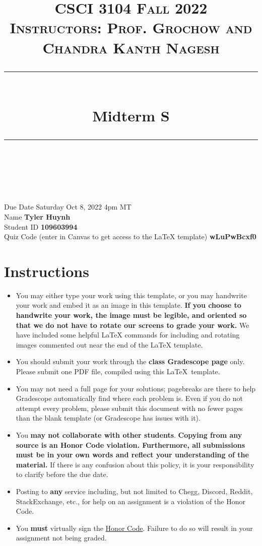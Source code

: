 \documentclass[11pt]{article}
\title{
\normalfont \normalsize 
\textsc{CSCI 3104 Fall 2022 \\ 
Instructors: Prof. Grochow and Chandra Kanth Nagesh} \\
[10pt] 
\rule{\linewidth}{0.5pt} \\[6pt] 
\huge Midterm S\standard \\
\rule{\linewidth}{2pt}  \\[10pt]
}
\date{}
\theoremstyle{definition}
\theoremstyle{definition}
\theoremstyle{definition}
\begin{document}

\maketitle


\noindent
Due Date \dotfill Saturday Oct 8, 2022 4pm MT \\
Name \dotfill \textbf{Tyler Huynh} \\
Student ID \dotfill \textbf{109603994} \\
Quiz Code (enter in Canvas to get access to the LaTeX template) \dotfill \textbf{wLuPwBcxf0}


\tableofcontents

\section*{Instructions}
 \begin{itemize}
	\item You may either type your work using this template, or you may handwrite your work and embed it as an image in this template. \textbf{If you choose to handwrite your work, the image must be legible, and oriented so that we do not have to rotate our screens to grade your work.} We have included some helpful LaTeX commands for including and rotating images commented out near the end of the LaTeX template.
	\item You should submit your work through the \textbf{class Gradescope page} only. Please submit one PDF file, compiled using this \LaTeX \ template.
	\item You may not need a full page for your solutions; pagebreaks are there to help Gradescope automatically find where each problem is. Even if you do not attempt every problem, please submit this document with no fewer pages than the blank template (or Gradescope has issues with it).

	\item You \textbf{may not collaborate with other students}. \textbf{Copying from any source is an Honor Code violation. Furthermore, all submissions must be in your own words and reflect your understanding of the material.} If there is any confusion about this policy, it is your responsibility to clarify before the due date. 

	\item Posting to \textbf{any} service including, but not limited to Chegg, Discord, Reddit, StackExchange, etc., for help on an assignment is a violation of the Honor Code.

	\item You \textbf{must} virtually sign the \hyperlink{HonorCode}{Honor Code}. Failure to do so will result in your assignment not being graded.
\end{itemize}
\end{document}
